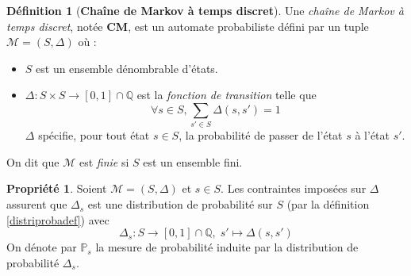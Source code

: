 \documentclass[12pt,a4paper]{report}
\theoremstyle{definition}%
\newtheorem{definition}{Définition}[chapter]
\newtheorem{propriete}{Propriété}[chapter]
\theoremstyle{remark}
\newcommand{\pr}{\mathbb{P}}
\let\labelitemi\labelitemii
\begin{document}
\theoremstyle{definition}
\begin{definition}[\textbf{Chaîne de Markov à temps discret}]

	Une \textit{chaîne de Markov à temps discret}, notée \textbf{CM}, est un automate probabiliste défini par un tuple  $\mathcal{M} = (S, \Delta)$ où :
	\begin{itemize}
		\renewcommand{\labelitemi}{\tiny$\bullet$}
		\item $S$ est un ensemble dénombrable d'états.
		\item $\Delta: S \times S \rightarrow [0,1] \cap \mathbb{Q}$ est la \textit{fonction de transition} telle que \[\forall s \in S, \sum_{s' \in S}\Delta(s, s')= 1\]
		$\Delta$ spécifie, pour tout état $s \in S$, la probabilité de passer de l'état $s$ à l'état $s'$.
	\end{itemize}
	On dit que $\mathcal{M}$ est \textit{finie} si $S$ est un ensemble fini.
\end{definition}

\begin{propriete} \label{distribmarkov}
	Soient $\mathcal{M} = (S, \Delta)$ et $s \in S$.
	Les contraintes imposées sur $\Delta$ assurent que $\Delta_s$ est une distribution de probabilité sur $S$  (par la définition \ref{distriprobadef}) avec \[\Delta_s : S \rightarrow [0, 1] \cap \mathbb{Q}, \; s' \mapsto \Delta(s, s')\] On dénote par $\pr_s$ la mesure de probabilité induite par la distribution de probabilité $\Delta_s$.%
\end{propriete}
\end{document}
